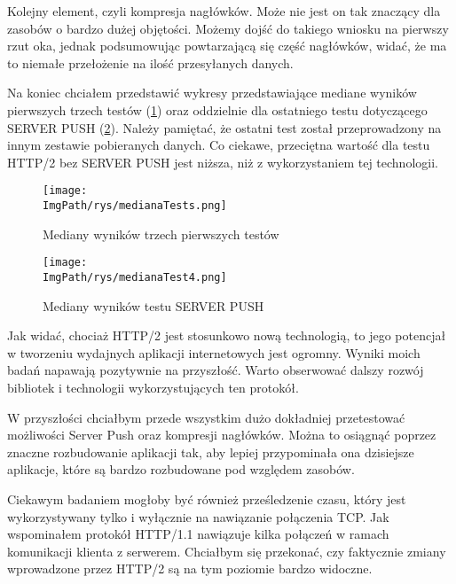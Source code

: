 \documentclass[a4paper,12pt,twoside,openany]{report}
\newcommand{\ImgPath}{.}
\begin{document}
Kolejny element, czyli kompresja nagłówków.
Może nie jest on tak znaczący dla zasobów o bardzo dużej objętości.
Możemy dojść do takiego wniosku na pierwszy rzut oka, jednak podsumowując powtarzającą się część nagłówków, widać, że ma to niemałe przełożenie na ilość przesyłanych danych.

Na koniec chciałem przedstawić wykresy przedstawiające  mediane wyników pierwszych trzech testów (\ref{schematMedianaTests}) oraz oddzielnie dla ostatniego testu dotyczącego SERVER PUSH (\ref{schematMedianaTest4}).
Należy pamiętać, że ostatni test został przeprowadzony na innym zestawie pobieranych danych.
Co ciekawe, przeciętna wartość dla testu HTTP/2 bez SERVER PUSH jest niższa, niż z wykorzystaniem tej technologii.

\begin{figure}[!htbp]
	\begin{center}
\centering
\texttt{[image: \\ImgPath/rys/medianaTests.png]}
\end{center}
	\caption{Mediany wyników trzech pierwszych testów}
	\label{schematMedianaTests}
\end{figure}

\begin{figure}[!htbp]
	\begin{center}
\centering
\texttt{[image: \\ImgPath/rys/medianaTest4.png]}
\end{center}
	\caption{Mediany wyników testu SERVER PUSH}
	\label{schematMedianaTest4}
\end{figure}

Jak widać, chociaż HTTP/2 jest stosunkowo nową technologią, to jego potencjał w tworzeniu wydajnych aplikacji internetowych jest ogromny. Wyniki moich badań napawają pozytywnie na przyszłość. Warto obserwować dalszy rozwój bibliotek i technologii wykorzystujących ten protokół.

W przyszłości chciałbym przede wszystkim dużo dokładniej przetestować możliwości Server Push oraz kompresji nagłówków. Można to osiągnąć poprzez znaczne rozbudowanie aplikacji tak, aby lepiej przypominała ona dzisiejsze aplikacje, które są bardzo rozbudowane pod względem zasobów.

Ciekawym badaniem mogłoby być również prześledzenie czasu, który jest wykorzystywany tylko i wyłącznie na nawiązanie połączenia TCP.
Jak wspominałem protokół HTTP/1.1 nawiązuje kilka połączeń w ramach komunikacji klienta z serwerem.
Chciałbym się przekonać, czy faktycznie zmiany wprowadzone przez HTTP/2 są na tym poziomie bardzo widoczne.
\end{document}
